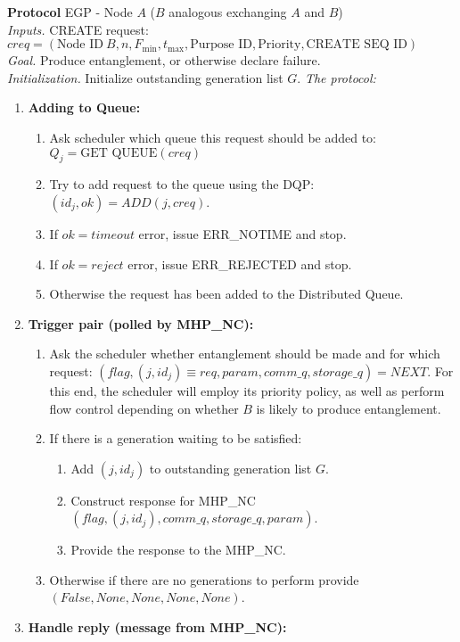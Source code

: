 \documentclass{article}
\makeatletter
\newcounter{Lprotocol}
\newenvironment{Lprotocol}[1]
  {\par\addvspace{\topsep}
   \noindent
   \tabularx{\linewidth}{@{} X @{}}
    \hline
    \refstepcounter{Lprotocol}\textbf{Protocol \theLprotocol} #1 \\
    \hline}
  { \\
    \hline
   \endtabularx
   \par\addvspace{\topsep}}
\newcommand{\sbline}{\\[.5\normalbaselineskip]}%
\makeatother
\begin{document}
\begin{Lprotocol}{EGP - Node $A$ ($B$ analogous exchanging $A$ and $B$)}
\textit{Inputs.} CREATE request: $creq = (\mbox{Node ID}\ B, n, F_{\min}, t_{\max}, \mbox{Purpose ID}, \mbox{Priority}, \mbox{CREATE SEQ ID})$
\sbline
\textit{Goal.} Produce entanglement, or otherwise declare failure.
\sbline
\textit{Initialization.} Initialize outstanding generation list $G$.
\textit{The protocol:}
\begin{enumerate}
  \item \textbf{Adding to Queue:}
  \begin{enumerate}
    \item Ask scheduler which queue this request should be added to: $Q_j = \mbox{GET QUEUE}(creq)$
    \item Try to add request to the queue using the DQP: $(id_j, ok) = ADD(j, creq)$.
    \item If $ok = timeout$ error, issue ERR\_NOTIME and stop.
    \item If $ok = reject$ error, issue ERR\_REJECTED and stop.
    \item Otherwise the request has been added to the Distributed Queue.
   \end{enumerate}
  \item \textbf{Trigger pair (polled by MHP\_NC):}
  \begin{enumerate}
	\item Ask the scheduler whether entanglement should be made and for which request: $(flag, (j,id_j) \equiv req, param, comm\_q, storage\_q) = NEXT$. For this end, the scheduler will employ its priority policy, as well as perform flow control depending on whether $B$ is likely to produce entanglement.
    \item If there is a generation waiting to be satisfied:
    \begin{enumerate}
	  \item Add $(j,id_j)$ to outstanding generation list $G$.
      \item Construct response for MHP\_NC $(flag, (j,id_j), comm\_q, storage\_q, param)$.
      \item Provide the response to the MHP\_NC.
    \end{enumerate}
    \item Otherwise if there are no generations to perform provide $(False, None, None, None, None)$.
   \end{enumerate}
   \item \textbf{Handle reply (message from MHP\_NC):}

\end{enumerate}
\end{Lprotocol}
\end{document}
